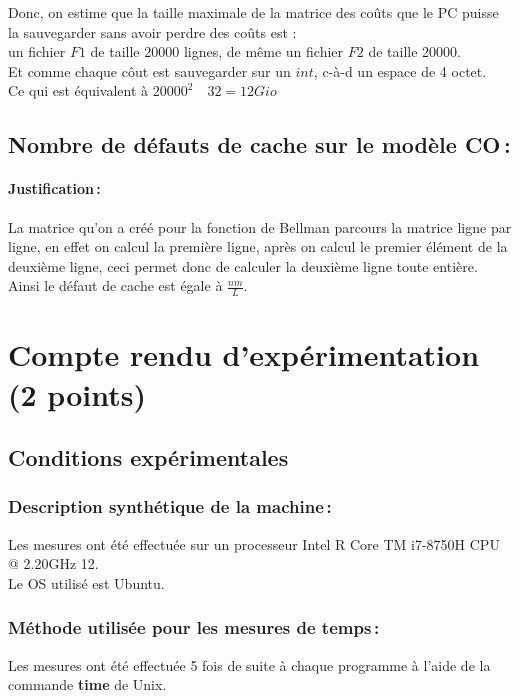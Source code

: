 \documentclass[a4paper,10pt,french]{article}
\begin{document}
  Donc, on estime que la taille maximale de la matrice des coûts que le PC puisse la sauvegarder sans avoir perdre des coûts est :\\
  un fichier $F1$ de taille 20000 lignes, de même un fichier $F2$ de taille 20000.\\
  
  Et comme chaque côut est sauvegarder sur un $int$, c-à-d un espace de 4 octet.\\
  
  Ce qui est équivalent à $20000^2 \quad 32= 12Gio$\\
    

  \subsection{Nombre de défauts de cache sur le modèle CO\,: }
    \paragraph{Justification\,: }
    La matrice qu'on a créé pour la fonction de Bellman parcours la matrice ligne par ligne, en effet on calcul la première ligne, après on calcul le premier élément de la deuxième ligne, ceci permet donc de calculer la deuxième ligne toute entière. Ainsi le défaut de cache est égale à $\frac{nm}{L}$.


\section{Compte rendu d'expérimentation (2 points)}
  \subsection{Conditions expérimentales}
    \subsubsection{Description synthétique de la machine\,:}
      Les mesures ont été effectuée sur un processeur Intel R Core TM i7-8750H CPU @ 2.20GHz 12.\\
     
     Le OS utilisé est Ubuntu.

    \subsubsection{Méthode utilisée pour les mesures de temps\,: }
      Les mesures ont été effectuée 5 fois de suite à chaque programme à l’aide de la commande {\bf time} de Unix.
\end{document}
